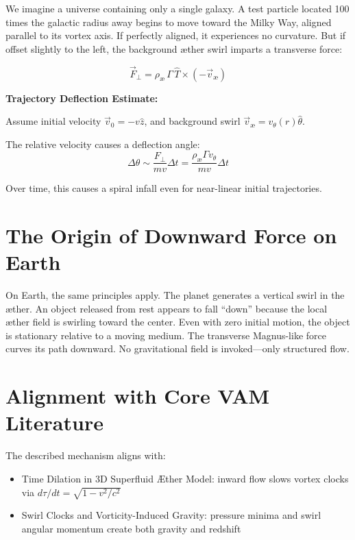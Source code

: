 \documentclass[11pt]{article}
\begin{document}
    We imagine a universe containing only a single galaxy. A test particle located 100 times the galactic radius away begins to move toward the Milky Way, aligned parallel to its vortex axis. If perfectly aligned, it experiences no curvature. But if offset slightly to the left, the background \ae ther swirl imparts a transverse force:

    \begin{equation}
        \vec{F}_\perp = \rho_\text{\ae} \, \Gamma \, \hat{T} \times \left(-\vec{v}_\text{\ae}\right)
    \end{equation}

    \textbf{Trajectory Deflection Estimate:}

    Assume initial velocity $\vec{v}_0 = -v \hat{z}$, and background swirl $\vec{v}_\text{\ae} = v_\theta(r) \hat{\theta}$.

    The relative velocity causes a deflection angle:
    \begin{equation}
        \Delta \theta \sim \frac{F_\perp}{mv} \Delta t = \frac{\rho_\text{\ae} \Gamma v_\theta}{mv} \Delta t
    \end{equation}

    Over time, this causes a spiral infall even for near-linear initial trajectories.

    \section*{The Origin of Downward Force on Earth}

    On Earth, the same principles apply. The planet generates a vertical swirl in the \ae ther. An object released from rest appears to fall ``down'' because the local \ae ther field is swirling toward the center. Even with zero initial motion, the object is stationary relative to a moving medium. The transverse Magnus-like force curves its path downward. No gravitational field is invoked---only structured flow.

    \section*{Alignment with Core VAM Literature}

    The described mechanism aligns with:
    \begin{itemize}
        \item Time Dilation in 3D Superfluid \AE ther Model: inward flow slows vortex clocks via $d\tau/dt = \sqrt{1 - v^2/c^2}$
        \item Swirl Clocks and Vorticity-Induced Gravity: pressure minima and swirl angular momentum create both gravity and redshift
    \end{itemize}
\end{document}
